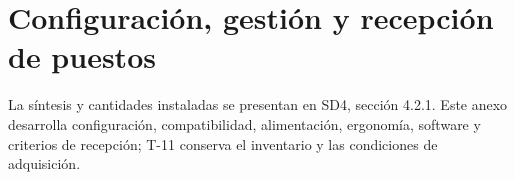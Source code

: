 \renewcommand{\thechapter}{A4.5}
\chapter{Configuración, gestión y recepción de puestos}
La síntesis y cantidades instaladas se presentan en SD4, sección 4.2.1. Este anexo desarrolla configuración, compatibilidad, alimentación, ergonomía, software y criterios de recepción; T-11 conserva el inventario y las condiciones de adquisición.


